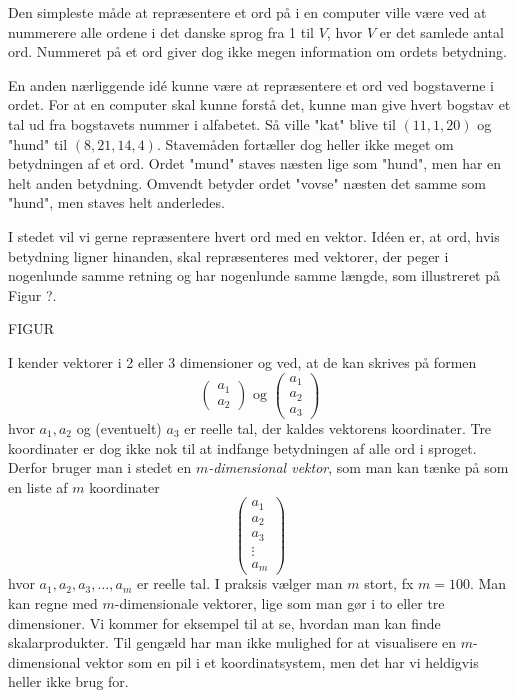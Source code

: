 \documentclass{article}
\newcommand{\am}[1]{{\color{red} #1}}
\begin{document}
Den simpleste måde at repræsentere et ord på i en computer ville være ved at nummerere alle ordene i det danske sprog fra 1 til $V$, hvor $V$ er det samlede antal ord. Nummeret på et ord giver dog ikke megen information om ordets betydning. 

En anden nærliggende idé kunne være at repræsentere et ord ved bogstaverne i ordet. For at en computer skal kunne forstå det, kunne man give hvert bogstav et tal ud fra bogstavets nummer i alfabetet. Så ville "kat" blive til $(11,1,20)$ og "hund" til $(8,21,14,4)$. Stavemåden fortæller dog heller ikke meget om betydningen af et ord. Ordet "mund" staves næsten lige som "hund", men har en helt anden betydning. Omvendt betyder 
ordet "vovse" næsten det samme som "hund", men staves helt anderledes. 

I stedet vil vi gerne repræsentere hvert ord med en vektor. Idéen er, at ord, hvis betydning ligner hinanden, skal repræsenteres med vektorer, der peger i nogenlunde samme retning og har nogenlunde samme længde, som illustreret på Figur ?.

\am{FIGUR}

I kender vektorer i 2 eller 3 dimensioner og ved, at de kan skrives på formen
$$\begin{pmatrix} a_1\\a_2\end{pmatrix}\text{ og } \begin{pmatrix} a_1\\a_2 \\a_3\end{pmatrix}$$
hvor $a_1, a_2$ og (eventuelt) $a_3$ er reelle tal, der kaldes vektorens koordinater. Tre koordinater er dog ikke nok til at indfange betydningen af alle ord i sproget. Derfor bruger man i stedet en \emph{$m$-dimensional vektor}, som man kan tænke på som en liste af $m$ koordinater 
$$\begin{pmatrix} a_1\\a_2\\a_3\\ \vdots \\ a_m\end{pmatrix}$$
hvor $a_1,a_2,a_3,\ldots,a_m$ er reelle tal. 
I praksis vælger man $m$ stort, fx $m=100$. 
Man kan regne med $m$-dimensionale vektorer, lige som man gør i to eller tre dimensioner. Vi kommer for eksempel til at se, hvordan man kan finde skalarprodukter. Til gengæld har man ikke mulighed for at visualisere en $m$-dimensional vektor som en pil i et koordinatsystem, men det har vi heldigvis heller ikke brug for.
\end{document}
